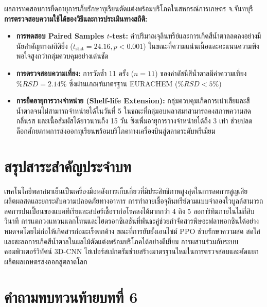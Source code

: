 \begin{agribox}{ผลการทดสอบการยืดอายุการเก็บรักษาทุเรียนตัดแต่งพร้อมบริโภคในสหกรณ์การเกษตร จ.จันทบุรี}
\textbf{การตรวจสอบความใช้ได้ของวิธีและการประเมินทางสถิติ:}
\begin{itemize}
    \item \textbf{การทดสอบ Paired Samples $t$-test:} ค่าปริมาณจุลินทรีย์และการเกิดสีน้ำตาลลดลงอย่างมีนัยสำคัญทางสถิติยิ่ง ($t_{\text{stat}} = 24.16, p < 0.001$) ในขณะที่ความแน่นเนื้อและคะแนนความพึงพอใจสูงกว่ากลุ่มควบคุมอย่างเด่นชัด
    \item \textbf{การตรวจสอบความเที่ยง:} การวัดซ้ำ 11 ครั้ง ($n = 11$) ของค่าดัชนีสีน้ำตาลมีค่าความเที่ยง $\%RSD = 2.14\%$ ซึ่งผ่านเกณฑ์มาตรฐาน EURACHEM ($\%RSD < 5\%$)
    \item \textbf{การยืดอายุการวางจำหน่าย (Shelf-life Extension):} กลุ่มควบคุมเกิดการเน่าเสียและสีน้ำตาลจนไม่สามารถจำหน่ายได้ในวันที่ 5 ในขณะที่กลุ่มอบพลาสมาสามารถคงสภาพความสด กลิ่นรส และเนื้อสัมผัสได้ยาวนานถึง 15 วัน ซึ่งเพิ่มอายุการวางจำหน่ายได้ถึง 3 เท่า ช่วยปลดล็อกศักยภาพการส่งออกทุเรียนพร้อมบริโภคทางเครื่องบินสู่ตลาดระดับพรีเมียม
\end{itemize}
\end{agribox}

\section{สรุปสาระสำคัญประจำบท}

เทคโนโลยีพลาสมาเย็นเป็นเครื่องมือหลังการเก็บเกี่ยวที่มีประสิทธิภาพสูงสุดในการลดการสูญเสียผลิตผลสดและยกระดับความปลอดภัยทางอาหาร การทำลายเชื้อจุลินทรีย์ตามแบบจำลองไวบูลล์สามารถลดการปนเปื้อนของแบคทีเรียและสปอร์เชื้อราก่อโรคลงได้มากกว่า 4 ถึง 5 ลอการิทึมภายในไม่กี่สิบวินาที การแตกวงแหวนแลกโทนและไฮดรอกซิเลชันที่พันธะคู่ช่วยกำจัดสารพิษอะฟลาทอกซินได้อย่างหมดจดโดยไม่ก่อให้เกิดสารก่อมะเร็งตกค้าง ขณะที่การยับยั้งเอนไซม์ PPO ช่วยรักษาความสด สดใส และชะลอการเกิดสีน้ำตาลในผลไม้ตัดแต่งพร้อมบริโภคได้อย่างดีเยี่ยม การผสานร่วมกับระบบคอมพิวเตอร์วิทัศน์ 3D-CNN ไฮเปอร์สเปกตรัมช่วยสร้างมาตรฐานใหม่ในการตรวจสอบและคัดแยกผลิตผลเกษตรส่งออกสู่ตลาดโลก

\section{คำถามทบทวนท้ายบทที่ 6}

